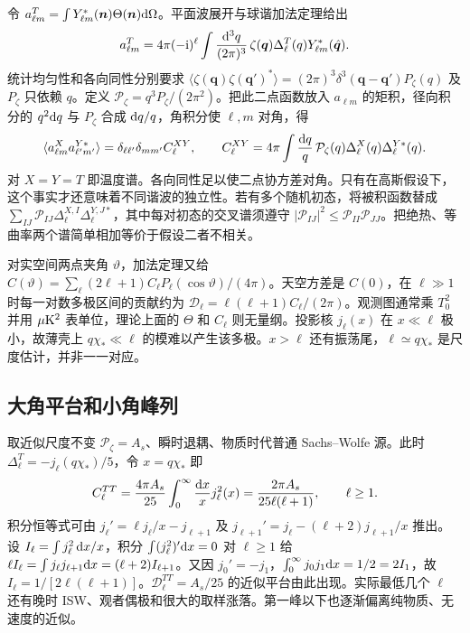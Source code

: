 令 $a_{\ell m}^T=\int Y_{\ell m}^*(\bm n)\Theta(\bm n)\dd\Omega$。平面波展开与球谐加法定理给出
\[
 a_{\ell m}^T=4\pi(-\mathrm{i})^\ell
    \int\frac{\dd^3q}{(2\pi)^3}\,\zeta(\bm q)
                  \Delta_\ell^T(q)Y_{\ell m}^*(\hat{\bm q}).
\]
统计均匀性和各向同性分别要求 $\langle\zeta(\bm q)\zeta(\bm q')^*\rangle=(2\pi)^3\delta^3(\bm q-\bm q')P_\zeta(q)$ 及 $P_\zeta$ 只依赖 $q$。定义 $\mathcal P_\zeta=q^3P_\zeta/(2\pi^2)$。把此二点函数放入 $a_{\ell m}$ 的矩积，径向积分的 $q^2\dd q$ 与 $P_\zeta$ 合成 $\dd q/q$，角积分使 $\ell,m$ 对角，得
\begin{equation}\label{eq:cl-Cls}
 \langle a_{\ell m}^X a_{\ell'm'}^{Y*}\rangle
 =\delta_{\ell\ell'}\delta_{mm'}C_\ell^{XY},\qquad
 C_\ell^{XY}=4\pi\int \frac{\dd q}{q}\,
          \mathcal P_\zeta(q)\Delta_\ell^X(q)\Delta_\ell^{Y*}(q).
\end{equation}
对 $X=Y=T$ 即温度谱。各向同性足以使二点协方差对角。只有在高斯假设下，这个事实才还意味着不同谐波的独立性。若有多个随机初态，将被积函数替成 $\sum_{IJ}\mathcal P_{IJ}\Delta_\ell^{X,I}\Delta_\ell^{Y,J*}$，其中每对初态的交叉谱须遵守 $|\mathcal P_{IJ}|^2\leqslant \mathcal P_{II}\mathcal P_{JJ}$。把绝热、等曲率两个谱简单相加等价于假设二者不相关。

对实空间两点夹角 $\vartheta$，加法定理又给 $C(\vartheta)=\sum_\ell (2\ell+1)C_\ell P_\ell(\cos\vartheta)/(4\pi)$。天空方差是 $C(0)$，在 $\ell\gg1$ 时每一对数多极区间的贡献约为 $\mathcal D_\ell=\ell(\ell+1)C_\ell/(2\pi)$。观测图通常乘 $T_0^2$ 并用 $\mu{\rm K}^2$ 表单位，理论上面的 $\Theta$ 和 $C_\ell$ 则无量纲。投影核 $j_\ell(x)$ 在 $x\ll\ell$ 极小，故薄壳上 $q\chi_*\ll\ell$ 的模难以产生该多极。$x>\ell$ 还有振荡尾，$\ell\simeq q\chi_*$ 是尺度估计，并非一一对应。

\subsection{大角平台和小角峰列}

取近似尺度不变 $\mathcal P_\zeta=A_s$、瞬时退耦、物质时代普通 Sachs--Wolfe 源。此时 $\Delta_\ell^T=-j_\ell(q\chi_*)/5$，令 $x=q\chi_*$ 即
\[
 C_\ell^{TT}=\frac{4\pi A_s}{25}\int_0^\infty\frac{\dd x}{x}j_\ell^2(x)
      =\frac{2\pi A_s}{25\ell(\ell+1)},\qquad \ell\ge1.
\]
积分恒等式可由 $j_\ell'=\ell j_\ell/x-j_{\ell+1}$ 及 $j_{\ell+1}'=j_\ell-(\ell+2)j_{\ell+1}/x$ 推出。设 $I_\ell=\int j_\ell^2\,\dd x/x$，积分 $\int (j_\ell^2)'\dd x=0$ 对 $\ell\ge1$ 给 $\ell I_\ell=\int j_\ell j_{\ell+1}\dd x=(\ell+2)I_{\ell+1}$。又因 $j_0'=-j_1$，$\int_0^\infty j_0j_1\dd x=1/2=2 I_1$，故 $I_\ell=1/[2\ell(\ell+1)]$。$\mathcal D_\ell^{TT}=A_s/25$ 的近似平台由此出现。实际最低几个 $\ell$ 还有晚时 ISW、观者偶极和很大的取样涨落。第一峰以下也逐渐偏离纯物质、无速度的近似。


